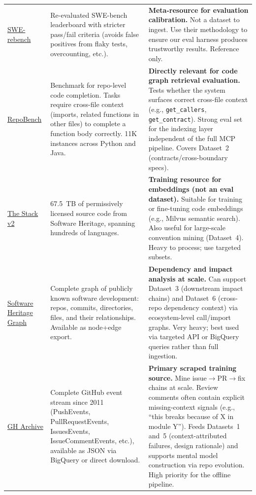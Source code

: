 \documentclass[a4paper,12pt]{article}
\begin{document}
\begin{longtable}{@{} p{3cm} p{5cm} p{7cm} @{}}
\href{https://huggingface.co/datasets/nebius/SWE-rebench-leaderboard}{SWE-rebench} &
Re-evaluated SWE-bench leaderboard with stricter pass/fail criteria (avoids false positives from flaky tests, overcounting, etc.). &
\textbf{Meta-resource for evaluation calibration.} Not a dataset to ingest. Use their methodology to ensure our eval harness produces trustworthy results. Reference only. \\

\href{https://github.com/Leolty/repobench}{RepoBench} &
Benchmark for repo-level code completion. Tasks require cross-file context (imports, related functions in other files) to complete a function body correctly. 11K instances across Python and Java. &
\textbf{Directly relevant for code graph retrieval evaluation.} Tests whether the system surfaces correct cross-file context (e.g., \texttt{get\_callers}, \texttt{get\_contract}). Strong eval set for the indexing layer independent of the full MCP pipeline. Covers Dataset~2 (contracts/cross-boundary specs). \\

\href{https://huggingface.co/datasets/bigcode/the-stack-v2}{The Stack v2} &
67.5~TB of permissively licensed source code from Software Heritage, spanning hundreds of languages. &
\textbf{Training resource for embeddings (not an eval dataset).} Suitable for training or fine-tuning code embeddings (e.g., Milvus semantic search). Also useful for large-scale convention mining (Dataset~4). Heavy to process; use targeted subsets. \\

\href{https://docs.softwareheritage.org/devel/swh-export/graph/}{Software Heritage Graph} &
Complete graph of publicly known software development: repos, commits, directories, files, and their relationships. Available as node+edge export. &
\textbf{Dependency and impact analysis at scale.} Can support Dataset~3 (downstream impact chains) and Dataset~6 (cross-repo dependency context) via ecosystem-level call/import graphs. Very heavy; best used via targeted API or BigQuery queries rather than full ingestion. \\

\href{https://www.gharchive.org/}{GH Archive} &
Complete GitHub event stream since 2011 (PushEvents, PullRequestEvents, IssuesEvents, IssueCommentEvents, etc.), available as JSON via BigQuery or direct download. &
\textbf{Primary scraped training source.} Mine issue$\rightarrow$PR$\rightarrow$fix chains at scale. Review comments often contain explicit missing-context signals (e.g., “this breaks because of X in module Y”). Feeds Datasets~1 and~5 (context-attributed failures, design rationale) and supports mental model construction via repo evolution. High priority for the offline pipeline. \\


\end{longtable}
\end{document}
